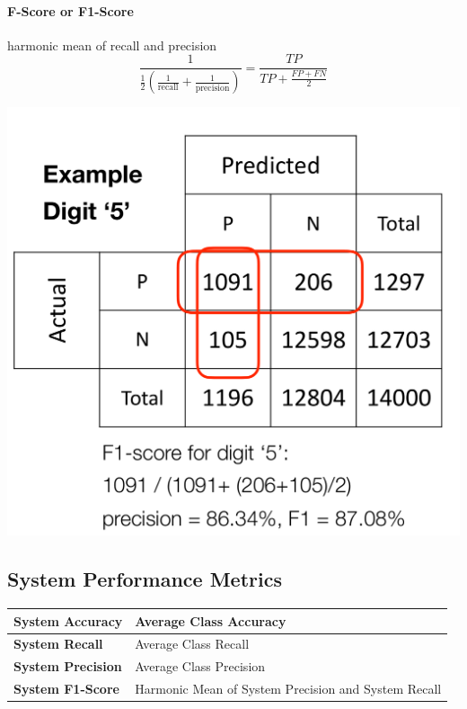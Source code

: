 \documentclass[11pt]{article}
\begin{document}
\begin{minipage}{0.5\textwidth}
	\paragraph{F-Score or F1-Score} harmonic mean of recall and precision
	\begin{equation*}
	\frac{1}{\frac{1}{2}\left(\frac{1}{\text{recall}} + \frac{1}{\text{precision}} \right)} = \frac{TP}{TP + \frac{FP + FN}{2}}
	\end{equation*}
\end{minipage}
\begin{minipage}{0.5\textwidth}
	\centering
	\includegraphics[width=0.8\linewidth,keepaspectratio]{f1_score}
\end{minipage}

\subsection{System Performance Metrics}
\noindent
\begin{minipage}{\textwidth}
	\renewcommand{\arraystretch}{1.5}
	\centering
	\begin{tabularx}{\linewidth}{|l|X|}
		\hline
		\textbf{System Accuracy} & Average Class Accuracy\\
		\hline
		\textbf{System Recall} & Average Class Recall\\
		\hline
		\textbf{System Precision} & Average Class Precision\\
		\hline
		\textbf{System F1-Score} & Harmonic Mean of System Precision and System Recall\\
		\hline
	\end{tabularx}
\end{minipage}
\end{document}
